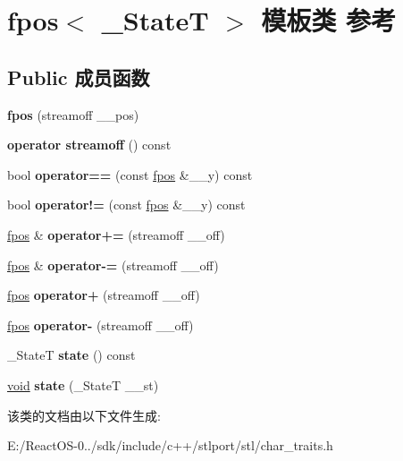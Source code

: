 \hypertarget{classfpos}{}\section{fpos$<$ \+\_\+\+StateT $>$ 模板类 参考}
\label{classfpos}
\subsection*{Public 成员函数}
\begin{DoxyCompactItemize}
\item 
\mbox{\label{classfpos_a56a47bfdcf93ec341d8212e00d450450}} 
{\bfseries fpos} (streamoff \+\_\+\+\_\+pos)
\item 
\mbox{\label{classfpos_a4a0b7289b784a2c8c84150ece1f3659e}} 
{\bfseries operator streamoff} () const
\item 
\mbox{\label{classfpos_a99ef5f9de02035d3dca35dcd67331b07}} 
bool {\bfseries operator==} (const \hyperlink{classfpos}{fpos} \&\+\_\+\+\_\+y) const
\item 
\mbox{\label{classfpos_a569355a892f1c37122a47349f15def64}} 
bool {\bfseries operator!=} (const \hyperlink{classfpos}{fpos} \&\+\_\+\+\_\+y) const
\item 
\mbox{\label{classfpos_a882f9537e33699ec61b89005a52f2841}} 
\hyperlink{classfpos}{fpos} \& {\bfseries operator+=} (streamoff \+\_\+\+\_\+off)
\item 
\mbox{\label{classfpos_ae8ac7d37161422886d9bbfd51d6e3983}} 
\hyperlink{classfpos}{fpos} \& {\bfseries operator-\/=} (streamoff \+\_\+\+\_\+off)
\item 
\mbox{\label{classfpos_a17706feb76fe3b514dc6482a07170abc}} 
\hyperlink{classfpos}{fpos} {\bfseries operator+} (streamoff \+\_\+\+\_\+off)
\item 
\mbox{\label{classfpos_ab9c4114ead03ebaccf3ea614a5293d5b}} 
\hyperlink{classfpos}{fpos} {\bfseries operator-\/} (streamoff \+\_\+\+\_\+off)
\item 
\mbox{\label{classfpos_a9a1fe56effdf1637f845b6123a9b2ad7}} 
\+\_\+\+StateT {\bfseries state} () const
\item 
\mbox{\label{classfpos_a25de4912ca9a970dd522c3b0a37ad559}} 
\hyperlink{interfacevoid}{void} {\bfseries state} (\+\_\+\+StateT \+\_\+\+\_\+st)
\end{DoxyCompactItemize}


该类的文档由以下文件生成\+:\begin{DoxyCompactItemize}
\item 
E\+:/\+React\+O\+S-\/0../sdk/include/c++/stlport/stl/char\+\_\+traits.\+h\end{DoxyCompactItemize}
